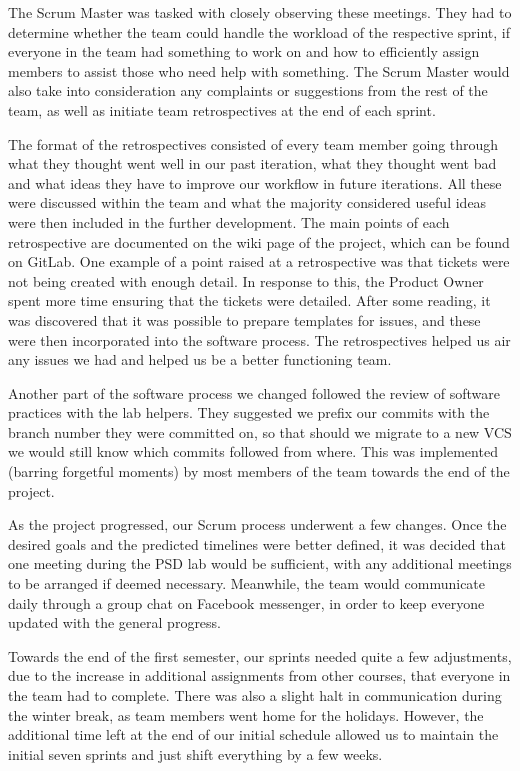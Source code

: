 \documentclass{l3proj}
\begin{document}
 The Scrum Master was tasked with closely observing these meetings. They had
  to determine whether the team could handle the workload of the respective
  sprint, if everyone in the team had something to work on and how to efficiently
  assign members to assist those who need help with something. The Scrum
  Master would also take into consideration any complaints or suggestions from
  the rest of the team, as well as initiate team retrospectives at the end of
  each sprint.
  
The format of the retrospectives
 consisted of every team member going through what they thought went well in
 our past iteration, what they thought went bad and what ideas they have to
 improve our workflow in future iterations. All these were discussed within
 the team and what the majority considered useful ideas were then included
 in the further development. The main points of each retrospective are
 documented on the wiki page of the project, which can be found on GitLab. One
 example of a point raised at a retrospective was that tickets were not being 
 created with enough detail. In response to this, the Product Owner spent more
 time ensuring that the tickets were detailed. After some reading, it was discovered
 that it was possible to prepare templates for issues, and these were then incorporated
 into the software process. The retrospectives helped us air any issues we had 
 and helped us be a better functioning team.
 
Another part of the software process we changed followed the review of 
 software practices with the lab helpers. They suggested we prefix our commits
 with the branch number they were committed on, so that should we migrate
 to a new VCS we would still know which commits followed from where. This
 was implemented (barring forgetful moments) by most members of the team
 towards the end of the project.

 As the project progressed, our Scrum process underwent a few changes. Once
 the desired goals and the predicted timelines were better defined, it was
 decided that one meeting during the PSD lab would be sufficient, with any
 additional meetings to be arranged if deemed necessary. Meanwhile, the team
 would communicate daily through a group chat on Facebook messenger, in order
 to keep everyone updated with the general progress.

Towards the end of the first semester, our sprints needed quite a few
 adjustments, due to the increase in additional assignments from other
 courses, that everyone in the team had to complete. There was also a
 slight halt in communication during the winter break, as team members
 went home for the holidays. However, the additional time left at the
 end of our initial schedule allowed us to maintain the initial seven
 sprints and just shift everything by a few weeks.
\end{document}
